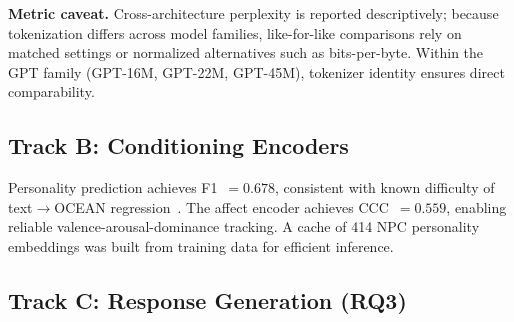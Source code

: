 \documentclass[11pt]{article}
\begin{document}
\textbf{Metric caveat.} Cross-architecture perplexity is reported descriptively; because tokenization differs across model families, like-for-like comparisons rely on matched settings or normalized alternatives such as bits-per-byte.
Within the GPT family (GPT-16M, GPT-22M, GPT-45M), tokenizer identity ensures direct comparability.

\subsection{Track B: Conditioning Encoders}

\begin{table}[t]
\centering
\caption{Conditioning encoder evaluation.}
\label{tab:encoders}
\small
{}
\end{table}

Personality prediction achieves F1~$=0.678$, consistent with known difficulty of text$\to$OCEAN regression~\cite{mairesse2007using}.
The affect encoder achieves CCC~$=0.559$, enabling reliable valence-arousal-dominance tracking.
A cache of 414 NPC personality embeddings was built from training data for efficient inference.

\subsection{Track C: Response Generation (RQ3)}
\end{document}
